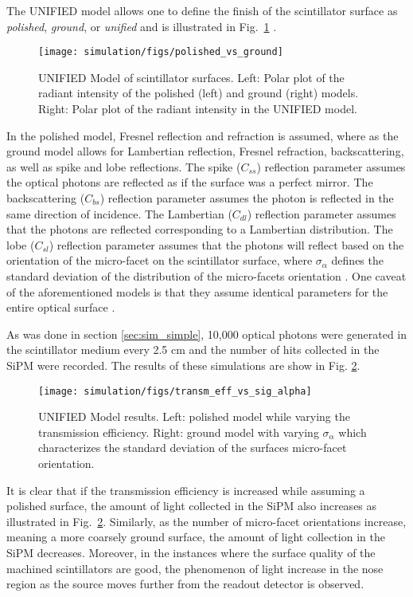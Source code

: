 The UNIFIED model allows one to define the finish of the scintillator surface as \textit{polished}, \textit{ground}, or \textit{unified} and is illustrated in Fig.~\ref{fig:polished_vs_ground} \cite{scint_surface_sim}.
	\begin{figure}[!htb]
	\centering
	\texttt{[image: simulation/figs/polished\_vs\_ground]}
	\caption{UNIFIED Model of scintillator surfaces.  Left: Polar plot of the radiant intensity of the polished (left) and ground (right) models.  Right: Polar plot of the radiant intensity in the UNIFIED model.}
	\label{fig:polished_vs_ground}
	\end{figure}
In the polished model, Fresnel reflection and refraction is assumed, where as the ground model allows for Lambertian reflection, Fresnel refraction, backscattering, as well as spike and lobe reflections.  The spike ($C_{ss}$) reflection parameter assumes the optical photons are reflected as if the surface was a perfect mirror.  The backscattering ($C_{bs}$) reflection parameter assumes the photon is reflected in the same direction of incidence.  The Lambertian ($C_{dl}$) reflection parameter assumes that the photons are reflected corresponding to a Lambertian distribution.  The lobe ($C_{sl}$) reflection parameter assumes that the photons will reflect based on the orientation of the micro-facet on the scintillator surface, where $\sigma_{\alpha}$ defines the standard deviation of the distribution of the micro-facets orientation \cite{scint_surface_sim}.  One caveat of the aforementioned models is that they assume identical parameters for the entire optical surface \cite{puneet_sim_wiki}.

As was done in section \ref{sec:sim_simple}, 10,000 optical photons were generated in the scintillator medium every 2.5 cm and the number of hits collected in the SiPM were recorded.  The results of these simulations are show in Fig. \ref{fig:transm_eff_vs_sig_alpha}.
	\begin{figure}[!htb]
	\centering
	\texttt{[image: simulation/figs/transm\_eff\_vs\_sig\_alpha]}
	\caption{UNIFIED Model results.  Left: polished model while varying the transmission efficiency.  Right: ground model with varying $\sigma_{\alpha}$ which characterizes the standard deviation of the surfaces micro-facet orientation.}
	\label{fig:transm_eff_vs_sig_alpha}
	\end{figure}
It is clear that if the transmission efficiency is increased while assuming a polished surface, the amount of light collected in the SiPM also increases as illustrated in Fig.~\ref{fig:transm_eff_vs_sig_alpha}.  Similarly, as the number of micro-facet orientations increase, meaning a more coarsely ground surface, the amount of light collection in the SiPM decreases.  Moreover, in the instances where the surface quality of the machined scintillators are good, the phenomenon of light increase in the nose region as the source moves further from the readout detector is observed.

